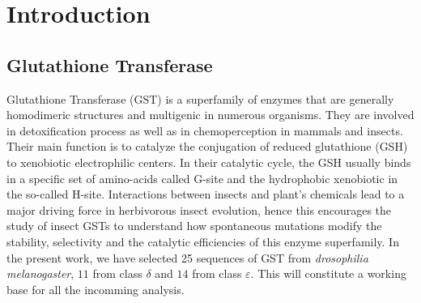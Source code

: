  

\chapter{Introduction}

\section{Glutathione Transferase}	
Glutathione Transferase (GST) is a superfamily of enzymes that are generally homodimeric structures and multigenic in numerous organisms. They are involved in detoxification process as well as in chemoperception in mammals and insects\cite{F-Neiers-GSTs}. Their main function is to catalyze the conjugation of reduced glutathione (GSH) to xenobiotic electrophilic centers\cite{GST-A1}. In their catalytic cycle, the GSH usually binds in a specific set of amino-acids called G-site and the hydrophobic xenobiotic in the so-called H-site. Interactions between insects and plant’s chemicals lead to a major driving force in herbivorous insect evolution, hence this encourages the study of insect GSTs to understand how spontaneous mutations modify the stability, selectivity and the catalytic efficiencies of this enzyme superfamily. In the present work, we have selected 25 sequences of GST from \textit{drosophilia melanogaster}, $11$ from class $\delta$ and $14$ from class $\varepsilon$.
This will constitute a working base for all the incomming analysis.
